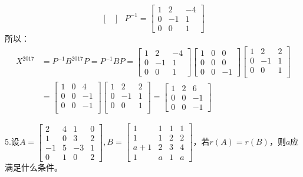 \documentclass{article}
\begin{document}
\begin{jie}
\begin{equation*}
\begin{bmatrix}
\end{bmatrix}~~~
P^{-1}=
\begin{bmatrix}
1 &2&-4\\
0&-1&1\\
0&0&1
\end{bmatrix}
\end{equation*}
所以：
\begin{align*}
X^{2017}&=P^{-1}B^{2017}P=P^{-1}BP=\begin{bmatrix}
1 &2&-4\\
0&-1&1\\
0&0&1
\end{bmatrix}
\begin{bmatrix}
  1&0&0 \\
  0&0&0\\
  0&0&-1
\end{bmatrix}
\begin{bmatrix}
1&2&2\\
0&-1&1\\
0&0&1\\
\end{bmatrix}\\
&=
\begin{bmatrix}
1&0&4\\
0&0&-1\\
0&0&-1\\
\end{bmatrix}
\begin{bmatrix}
1&2&2\\
0&-1&1\\
0&0&1\\
\end{bmatrix}=\begin{bmatrix}
1&2&6\\
0&0&-1\\
0&0&-1
\end{bmatrix}
\end{align*}
\end{jie}

5.设$
A=\begin{bmatrix}
   2 & 4 & 1 & 0\\
   1 & 0 & 3 & 2\\
   -1 & 5 & -3 & 1\\
   0 & 1 & 0 & 2
  \end{bmatrix},B=
  \begin{bmatrix}
   1& 1& 1 & 1\\
   1 & 1 & 2 & 2\\
   a+1 & 2 & 3 &4\\
   1 & a & 1 & a
  \end{bmatrix}
$，若$r(A)=r(B)$，则$a$应满足什么条件。
\end{document}
